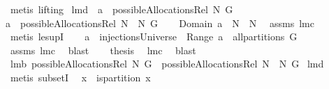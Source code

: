 \begin{isabellebody}
\ {\isacharparenleft}metis\ {\isacharparenleft}lifting{\isacharparenright}{\isacharparenright}%
\endisatagproof
{\isafoldproof}%
%
\isadelimproof
\isanewline
%
\endisadelimproof
\isanewline
{}\isamarkupfalse%
\ lm{}{}d{\isacharcolon}\ \ {\isachardoublequoteopen}a\ {\isasymin}\ possibleAllocationsRel\ N{}\ G{\isachardoublequoteclose}\ \ \isanewline
{\isachardoublequoteopen}a\ {\isasymin}\ possibleAllocationsRel\ {\isacharparenleft}N{}\ {\isasymunion}\ N{}{\isacharparenright}\ G{\isachardoublequoteclose}\isanewline
%
\isadelimproof
%
\endisadelimproof
%
\isatagproof
{}\isamarkupfalse%
\ {\isacharminus}\ \isanewline
{}\isamarkupfalse%
\ {\isachardoublequoteopen}Domain\ a\ {\isasymsubseteq}\ N{}\ {\isasymunion}\ N{}{\isachardoublequoteclose}\ \isamarkupfalse%
\ assms{\isacharparenleft}{}{\isacharparenright}\ lm{}{}c\ \isamarkupfalse%
\ {\isacharparenleft}metis\ le{\isacharunderscore}supI{}{\isacharparenright}\ \isanewline
{}\isamarkupfalse%
\ \isamarkupfalse%
\ {\isachardoublequoteopen}a\ {\isasymin}\ injectionsUniverse\ {\isacharampersand}\ Range\ a\ {\isasymin}\ all{\isacharunderscore}partitions\ G{\isachardoublequoteclose}\ \isanewline
{}\isamarkupfalse%
\ assms\ lm{}{}c\ \isamarkupfalse%
\ blast\ \isamarkupfalse%
\ \isamarkupfalse%
\ {\isacharquery}thesis\ \isamarkupfalse%
\ lm{}{}c\ \isamarkupfalse%
\ blast\ \isanewline
{}\isamarkupfalse%
%
\endisatagproof
{\isafoldproof}%
%
\isadelimproof
\isanewline
%
\endisadelimproof
\isanewline
{}\isamarkupfalse%
\ lm{}{}b{\isacharcolon}\ {\isachardoublequoteopen}possibleAllocationsRel\ N{}\ G\ {\isasymsubseteq}\ possibleAllocationsRel\ {\isacharparenleft}N{}\ {\isasymunion}\ N{}{\isacharparenright}\ G{\isachardoublequoteclose}\isanewline
%
\isadelimproof
%
\endisadelimproof
%
\isatagproof
{}\isamarkupfalse%
\ lm{}{}d\ \isamarkupfalse%
\ {\isacharparenleft}metis\ subsetI{\isacharparenright}%
\endisatagproof
{\isafoldproof}%
%
\isadelimproof
\isanewline
%
\endisadelimproof
\isanewline
{}\isamarkupfalse%
\ \ {\isachardoublequoteopen}x{\isasymnoteq}{\isacharbraceleft}{\isacharbraceright}{\isachardoublequoteclose}\ \ {\isachardoublequoteopen}is{\isacharunderscore}partition\ {\isacharbraceleft}x{\isacharbraceright}{\isachardoublequoteclose}%

\end{isabellebody}
